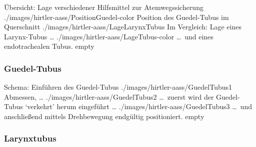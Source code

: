 \documentclass[
ngerman,
paper=a4,
asymmetric,
fontsize=8pt,
draft=false,
numbers=noenddot,
bibtotocnumbered,
footnotes=multiple,
toc=flat,
]{scrbook}
\begin{document}
\begin{PictureSeriesWide}{}{Übersicht: Lage verschiedener
Hilfsmittel zur Atemwegssicherung
\label{fig:uebersicht-lage-atemwegshilfen}}
{./images/hirtler-aass/PositionGuedel-color}
{Position des Guedel-Tubus im Querschnitt}
{./images/hirtler-aass/LageLarynxTubus}
{Im Vergleich: Lage eines Larynx-Tubus \ldots} 
{./images/hirtler-aass/LageTubus-color}
{\ldots\ und eines endotrachealen Tubus.}
{empty}
{}
\end{PictureSeriesWide}

\subsubsection{Guedel-Tubus}
\Text


\begin{PictureSeriesWide}{}{Schema: Einführen des Guedel-Tubus
\label{fig:guedel-einfuehren}}
{./images/hirtler-aass/GuedelTubus1}
{Abmessen, \ldots}
{./images/hirtler-aass/GuedelTubus2}
{\ldots\ zuerst wird der Guedel-Tubus \enquote*{verkehrt}
herum eingeführt \ldots}
{./images/hirtler-aass/GuedelTubus3}
{\ldots\ und anschließend mittels Drehbewegung endgültig
positioniert.}
{empty}
{}
\end{PictureSeriesWide}




\subsubsection{Larynxtubus{\texttrademark}}
\end{document}
